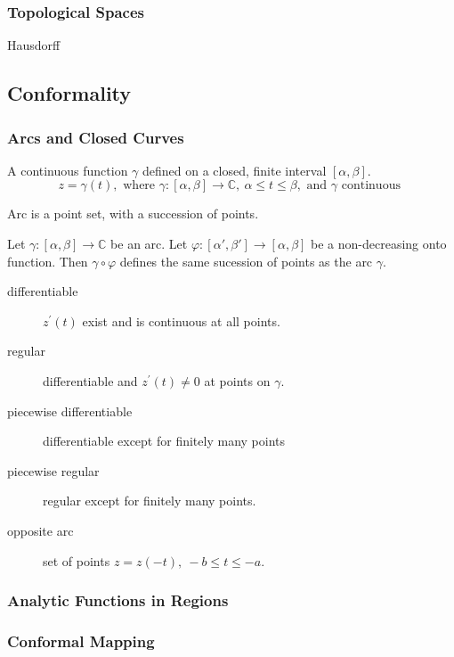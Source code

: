 \subsubsection{Topological Spaces}
Hausdorff
\subsection{Conformality}
\subsubsection{Arcs and Closed Curves}
\begin{definition}[Arc]
	A continuous function $\gamma$ defined on a closed, finite interval $[\alpha,\beta]$.	
	\begin{equation}
		z = \gamma(t), \text{ where } \gamma : [\alpha,\beta] \to \mathbb{C},\ \alpha \le t \le \beta,\text{ and } \gamma \text{ continuous }
	\end{equation}
\end{definition}

\begin{remark}
	Arc is a point set, with a succession of points.
\end{remark}

\begin{definition}
	Let $\gamma : [\alpha,\beta] \to \mathbb{C}$ be an arc.
	Let $\varphi : [\alpha',\beta'] \to [\alpha,\beta]$ be a non-decreasing onto function.
	Then $\gamma \circ \varphi$ defines the same sucession of points as the arc $\gamma$.
\end{definition}

\begin{description}
	\item[differentiable] $z^\prime(t)$ exist and is continuous at all points.
	\item[regular] differentiable and $z^\prime(t) \ne 0$ at points on $\gamma$.
	\item[piecewise differentiable] differentiable except for finitely many points
	\item[piecewise regular] regular except for finitely many points.
	\item[opposite arc] set of points $z = z(-t),\ -b \le t \le -a$.
\end{description}
\subsubsection{Analytic Functions in Regions}
\subsubsection{Conformal Mapping}
